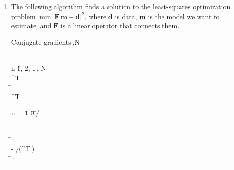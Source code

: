 \begin{enumerate}

\item The following algorithm finds a solution to
  the least-squares optimization problem $\min
  |\mathbf{F}\,\mathbf{m} - \mathbf{d}|^2$, where $\mathbf{d}$ is
  data, $\mathbf{m}$ is the model we want to estimate, and
  $\mathbf{F}$ is a linear operator that connects them.

\newpage

 \begin{algorithm}{Conjugate gradients}{,,N}
   \\
   \\
  \begin{FOR}{n \= 1, 2, \ldots, N} \\
     \= ^T\, \\
     \= \, \\
    \rho \= ^T\, \\
    \begin{IF}{n = 1} 
      \beta \= 0 
      \ELSE 
      \beta \= \rho/\hat{\rho} 
    \end{IF} \\
     \= 
     + \beta\,
     \\
    \alpha \= - \rho/(^T\,) \\
     \= 
     + \alpha\,
     \\
    \hat{\rho} \= \rho
  \end{FOR} \\        
  \RETURN {}
\end{algorithm}


\end{enumerate}
